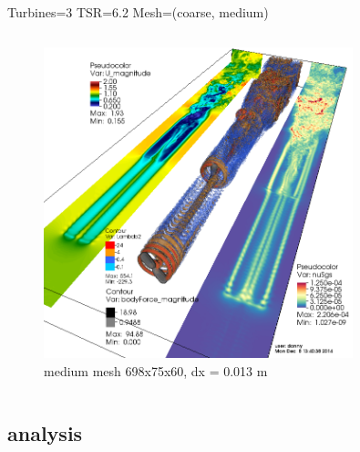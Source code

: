 \documentclass[xcolor=x11names,compress]{beamer}
\renewcommand{\(}{\begin{columns}}
\renewcommand{\)}{\end{columns}}
\newcommand{\<}[1]{\begin{column}{#1}}
\renewcommand{\>}{\end{column}}
\begin{document}
\begin{frame}{Turbines=3  TSR=6.2  Mesh=(coarse, medium)}
\begin{columns}
		    \begin{column}{0.6\textwidth}
		        \begin{figure}[p]
				    \centering
				    \includegraphics[width=0.8\textwidth]{figures/fastFlume-v6__Turbines=3_TSR=6p2_Layout=offset_Mesh=medium_maxTime=10.png}
				    \caption{\scriptsize{medium mesh 698x75x60, dx = 0.013 m}}
				\end{figure}

		    \end{column}

		\end{columns}

	\end{frame}


\subsection{analysis}
	
\end{document}
